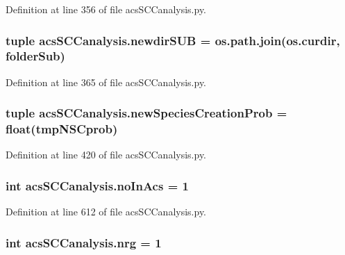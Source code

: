 Definition at line 356 of file acs\-S\-C\-Canalysis.\-py.

\hypertarget{a00096_adb3b62d0896774bc87adfee19d047aa8}{
\subsubsection[{newdir\-S\-U\-B}]{\setlength{\rightskip}{0pt plus 5cm}tuple acs\-S\-C\-Canalysis.\-newdir\-S\-U\-B = os.\-path.\-join(os.\-curdir, {\bf folder\-Sub})}}\label{a00096_adb3b62d0896774bc87adfee19d047aa8}


Definition at line 365 of file acs\-S\-C\-Canalysis.\-py.

\hypertarget{a00096_a47b24df6e487f6dd90158dde93cc7c93}{
\subsubsection[{new\-Species\-Creation\-Prob}]{\setlength{\rightskip}{0pt plus 5cm}tuple acs\-S\-C\-Canalysis.\-new\-Species\-Creation\-Prob = float(tmp\-N\-S\-Cprob)}}\label{a00096_a47b24df6e487f6dd90158dde93cc7c93}


Definition at line 420 of file acs\-S\-C\-Canalysis.\-py.

\hypertarget{a00096_a4766b3ca835449f1aa287fda699c7f96}{
\subsubsection[{no\-In\-Acs}]{\setlength{\rightskip}{0pt plus 5cm}int acs\-S\-C\-Canalysis.\-no\-In\-Acs = 1}}\label{a00096_a4766b3ca835449f1aa287fda699c7f96}


Definition at line 612 of file acs\-S\-C\-Canalysis.\-py.

\hypertarget{a00096_a948683f966c62ac856582281c3cda1f4}{
\subsubsection[{nrg}]{\setlength{\rightskip}{0pt plus 5cm}int acs\-S\-C\-Canalysis.\-nrg = 1}}\label{a00096_a948683f966c62ac856582281c3cda1f4}


